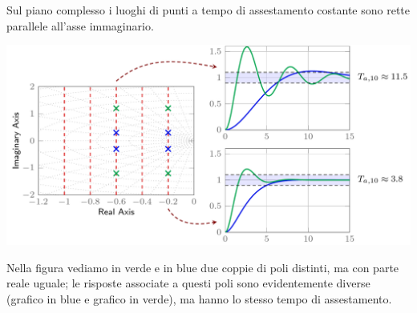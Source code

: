 \documentclass{article}
\numberwithin{equation}{subsection}
\begin{document}
Sul piano complesso i luoghi di punti a tempo di assestamento costante sono rette parallele all'asse immaginario.
\begin{center}
    \includegraphics[scale=0.23]{Images/Tempo_assestamento_costante.png}
\end{center}
Nella figura vediamo in verde e in blue due coppie di poli distinti, ma con parte reale uguale; le risposte associate a questi poli sono evidentemente diverse (grafico in blue e grafico in verde), ma hanno lo stesso tempo di assestamento.
\end{document}
